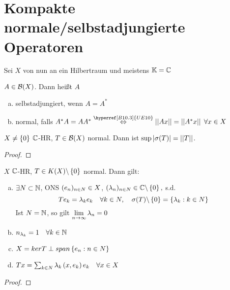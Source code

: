 	\section{Kompakte normale/selbstadjungierte Operatoren}
	Sei $X$ von nun an ein Hilbertraum und meistens $\mathbb{K} = \mathbb{C}$

	\begin{definition}
	\label{def:5.20}
		$A \in \BS[X]$. Dann heißt $A$ 
			\begin{enumerate}[a)]
				\item selbstadjungiert, wenn $A = A^*$
				\item normal, falls $A^* A = A A^* \aq[{\hyperref[B10.3]{UE10}}] 
					\norm{Ax} = \norm{A^* x} \; \forall x \in X$ 
			\end{enumerate}
	\end{definition}
	
	\begin{lemma}
	\label{lem:5.21}
		$X \neq \left\{0\right\}$ $\mathbb{C}$-HR, $T\in \BS[X]$ normal. Dann ist $\sup|\sigma(T)| = \left\lvert \left\lvert T \right\rvert \right\rvert$.
	\end{lemma}

	\begin{proof}
		\todor	
	\end{proof}

		
	\begin{thm}
	\label{thm:5.22}
		$X$ $\mathbb{C}$-HR, $T\in K(X)\backslash\left\{0\right\}$ normal. Dann gilt:
			\begin{enumerate}[a)]
				\item $\exists N\subset \mathbb{N}$, ONS $(e_n)_{n\in N} \in X$, 
					$(\lambda_n)_{n\in N}\in \mathbb{C}\backslash\left\{0\right\},$ s.d. 
					$$ T e_k = \lambda_k e_k \quad \forall k\in N, \quad 
						\sigma(T)\backslash\left\{0\right\} = \left\{\lambda_k: k \in N\right\} $$
				Ist $N = \mathbb{N}$, so gilt $\displaystyle \lim_{n \to \infty} \lambda_n = 0$
				\item $n_{\lambda_k} = 1 \quad \forall k\in\mathbb{N}$
				\item $X = ker T \perp span\left\{e_n : n\in N\right\}$
				\item $Tx = \sum_{k\in N} \lambda_k \left (x,e_k \right) e_k \quad \forall x \in X$
			\end{enumerate}
	\end{thm}
	
	\begin{proof}
		\todor	
	\end{proof}

